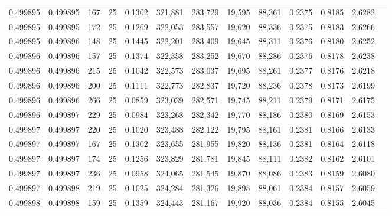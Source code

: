 \begin{tabular}{rrrrrrrrrrrrr}
0.499895 & 0.499895 &   167 &  25 &                                     0.1302 & 321,881 & 283,729 &  19,595 &  88,361 & 0.2375 & 0.8185 & 2.6282 \\
0.499895 & 0.499895 &   172 &  25 &                                     0.1269 & 322,053 & 283,557 &  19,620 &  88,336 & 0.2375 & 0.8183 & 2.6266 \\
0.499895 & 0.499896 &   148 &  25 &                                     0.1445 & 322,201 & 283,409 &  19,645 &  88,311 & 0.2376 & 0.8180 & 2.6252 \\
0.499896 & 0.499896 &   157 &  25 &                                     0.1374 & 322,358 & 283,252 &  19,670 &  88,286 & 0.2376 & 0.8178 & 2.6238 \\
0.499896 & 0.499896 &   215 &  25 &                                     0.1042 & 322,573 & 283,037 &  19,695 &  88,261 & 0.2377 & 0.8176 & 2.6218 \\
0.499896 & 0.499896 &   200 &  25 &                                     0.1111 & 322,773 & 282,837 &  19,720 &  88,236 & 0.2378 & 0.8173 & 2.6199 \\
0.499896 & 0.499896 &   266 &  25 &                                     0.0859 & 323,039 & 282,571 &  19,745 &  88,211 & 0.2379 & 0.8171 & 2.6175 \\
0.499896 & 0.499897 &   229 &  25 &                                     0.0984 & 323,268 & 282,342 &  19,770 &  88,186 & 0.2380 & 0.8169 & 2.6153 \\
0.499897 & 0.499897 &   220 &  25 &                                     0.1020 & 323,488 & 282,122 &  19,795 &  88,161 & 0.2381 & 0.8166 & 2.6133 \\
0.499897 & 0.499897 &   167 &  25 &                                     0.1302 & 323,655 & 281,955 &  19,820 &  88,136 & 0.2381 & 0.8164 & 2.6118 \\
0.499897 & 0.499897 &   174 &  25 &                                     0.1256 & 323,829 & 281,781 &  19,845 &  88,111 & 0.2382 & 0.8162 & 2.6101 \\
0.499897 & 0.499897 &   236 &  25 &                                     0.0958 & 324,065 & 281,545 &  19,870 &  88,086 & 0.2383 & 0.8159 & 2.6080 \\
0.499897 & 0.499898 &   219 &  25 &                                     0.1025 & 324,284 & 281,326 &  19,895 &  88,061 & 0.2384 & 0.8157 & 2.6059 \\
0.499898 & 0.499898 &   159 &  25 &                                     0.1359 & 324,443 & 281,167 &  19,920 &  88,036 & 0.2384 & 0.8155 & 2.6045 \\

\end{tabular}
